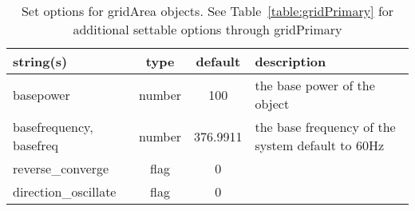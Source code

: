 \begin{table}[ht]
\centering
\begin{tabular}{p{5cm} c c p{7cm}}
\hline
string(s) & type & default & description \\
\hline
basepower & number & 100 & the base power of the object\\
basefrequency, basefreq & number & 376.9911 & the base frequency of the system default to 60Hz\\
reverse\_converge & flag & 0 & \\
direction\_oscillate & flag & 0 & \\
\hline
\end{tabular}
\caption{Set options for gridArea objects. See Table~\ref{table:gridPrimary} for additional settable options through gridPrimary}
\label{table:gridArea}
\end{table}
